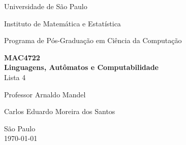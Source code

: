 \documentclass[brazil, a4paper,12pt]{article}
\begin{document}
\begin{titlepage}

  \vfill

  \begin{center}
    \begin{large}
      Universidade de São Paulo
    \end{large}
  \end{center}

  \begin{center}
    \begin{large}
      Instituto de Matemática e Estatística
    \end{large}
  \end{center}

  \begin{center}
    \begin{large}
      Programa de Pós-Graduação em Ciência da Computação
    \end{large}
  \end{center}

  \vfill

  \begin{center}
    \begin{Large}
        \textbf{MAC4722}\\
        \textbf{Linguagens, Autômatos e Computabilidade}\\
          Lista 4\\
    \end{Large}
  \end{center}

  \vfill

  \begin{center}
    \begin{large}
      Professor Arnaldo Mandel
    \end{large}
  \end{center}

  \begin{center}
    \begin{large}
      Carlos Eduardo Moreira dos Santos
    \end{large}
  \end{center}

  \vfill

  \begin{center}
    \begin{large}
      São Paulo \\
      \today \\
    \end{large}
  \end{center}

\clearpage
\end{titlepage}
\end{document}
